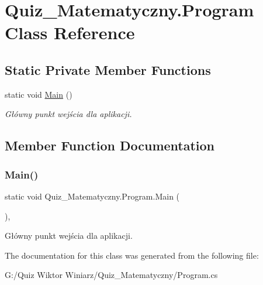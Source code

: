 \hypertarget{class_quiz___matematyczny_1_1_program}{}\section{Quiz\+\_\+\+Matematyczny.\+Program Class Reference}
\label{class_quiz___matematyczny_1_1_program}
\subsection*{Static Private Member Functions}
\begin{DoxyCompactItemize}
\item 
static void \mbox{\hyperlink{class_quiz___matematyczny_1_1_program_a343844bfbcc6ba29353871fb2234ecba}{Main}} ()
\begin{DoxyCompactList}\small\item\em Główny punkt wejścia dla aplikacji. \end{DoxyCompactList}\end{DoxyCompactItemize}


\subsection{Member Function Documentation}
\mbox{\label{class_quiz___matematyczny_1_1_program_a343844bfbcc6ba29353871fb2234ecba}} 
\subsubsection{\texorpdfstring{Main()}{Main()}}
{\footnotesize\ttfamily static void Quiz\+\_\+\+Matematyczny.\+Program.\+Main (\begin{DoxyParamCaption}{ }\end{DoxyParamCaption})\hspace{0.3cm}{\ttfamily [static]}, {\ttfamily [private]}}



Główny punkt wejścia dla aplikacji. 



The documentation for this class was generated from the following file\+:\begin{DoxyCompactItemize}
\item 
G\+:/\+Quiz Wiktor Winiarz/\+Quiz\+\_\+\+Matematyczny/Program.\+cs\end{DoxyCompactItemize}
